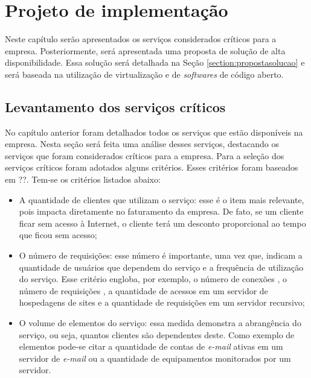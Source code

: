\chapter{Projeto de implementação}
\label{cap:projetoimplementacao}

Neste capítulo serão apresentados os serviços considerados críticos para a empresa. Posteriormente, será apresentada uma proposta de solução 
de alta disponibilidade. Essa solução será detalhada na Seção \ref{section:propostasolucao} e será baseada na utilização de virtualização e 
de \textit{softwares} de código aberto. 

\section{Levantamento dos serviços críticos}
\label{section:servcrit}

No capítulo anterior foram detalhados todos os serviços que estão disponíveis na empresa. Nesta seção será feita uma análise desses
serviços, destacando os serviços que foram considerados críticos para a empresa. Para a seleção dos serviços críticos foram adotados alguns 
critérios. Esses critérios foram baseados em ??. Tem-se os critérios listados abaixo:
\begin{itemize}
 \item A quantidade de clientes que utilizam o serviço: esse é o item mais relevante, pois impacta diretamente no faturamento
 da empresa. De fato, se um cliente ficar sem acesso à Internet, o cliente terá um desconto proporcional ao tempo que ficou sem 
 acesso; 
 \item O número de requisições: esse número é importante, uma vez que, indicam a quantidade de usuários que dependem do serviço e a frequência
 de utilização do serviço. Esse critério engloba, por exemplo, o número de conexões  \cite{tanenbaum2011}, o número de requisições 
  \cite{tanenbaum2011}, a quantidade de acessos em um servidor de hospedagens de sites e a quantidade de requisições  
 em um servidor recursivo;
 \item O volume de elementos do serviço: essa medida demonstra a abrangência do serviço, ou seja, quantos clientes são dependentes deste. 
 Como exemplo de elementos pode-se citar a quantidade de contas de \textit{e-mail} ativas em um servidor de \textit{e-mail} ou a quantidade de 
 equipamentos monitorados por um servidor.
\end{itemize}

